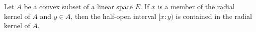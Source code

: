 Let $A$ be a convex subset of a linear space $E$. If $x$ is a member of the radial kernel of $A$ and $y \in A$, then the half-open interval $[x:y)$ is contained in the radial kernel of $A$.
